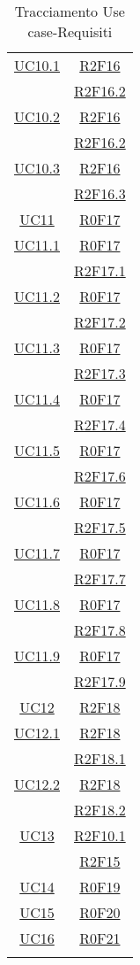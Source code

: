 \begin{longtable}{|c|c|}
\hline
\hyperlink{UC10.1}{UC10.1} & \hyperlink{R2F16}{R2F16}\\
& \hyperlink{R2F16.2}{R2F16.2}\\
\hline
\hyperlink{UC10.2}{UC10.2} & \hyperlink{R2F16}{R2F16}\\
& \hyperlink{R2F16.2}{R2F16.2}\\
\hline
\hyperlink{UC10.3}{UC10.3} & \hyperlink{R2F16}{R2F16}\\
& \hyperlink{R2F16.3}{R2F16.3}\\
\hline
\hyperlink{UC11}{UC11} & \hyperlink{R0F17}{R0F17}\\
\hline
\hyperlink{UC11.1}{UC11.1} & \hyperlink{R0F17}{R0F17}\\
& \hyperlink{R2F17.1}{R2F17.1}\\
\hline
\hyperlink{UC11.2}{UC11.2} & \hyperlink{R0F17}{R0F17}\\
& \hyperlink{R2F17.2}{R2F17.2}\\
\hline
\hyperlink{UC11.3}{UC11.3} & \hyperlink{R0F17}{R0F17}\\
& \hyperlink{R2F17.3}{R2F17.3}\\
\hline
\hyperlink{UC11.4}{UC11.4} & \hyperlink{R0F17}{R0F17}\\
& \hyperlink{R2F17.4}{R2F17.4}\\
\hline
\hyperlink{UC11.5}{UC11.5} & \hyperlink{R0F17}{R0F17}\\
& \hyperlink{R2F17.6}{R2F17.6}\\
\hline
\hyperlink{UC11.6}{UC11.6} & \hyperlink{R0F17}{R0F17}\\
& \hyperlink{R2F17.5}{R2F17.5}\\
\hline
\hyperlink{UC11.7}{UC11.7} & \hyperlink{R0F17}{R0F17}\\
& \hyperlink{R2F17.7}{R2F17.7}\\
\hline
\hyperlink{UC11.8}{UC11.8} & \hyperlink{R0F17}{R0F17}\\
& \hyperlink{R2F17.8}{R2F17.8}\\
\hline
\hyperlink{UC11.9}{UC11.9} & \hyperlink{R0F17}{R0F17}\\
& \hyperlink{R2F17.9}{R2F17.9}\\
\hline
\hyperlink{UC12}{UC12} & \hyperlink{R2F18}{R2F18}\\
\hline
\hyperlink{UC12.1}{UC12.1} & \hyperlink{R2F18}{R2F18}\\
& \hyperlink{R2F18.1}{R2F18.1}\\
\hline
\hyperlink{UC12.2}{UC12.2} & \hyperlink{R2F18}{R2F18}\\
& \hyperlink{R2F18.2}{R2F18.2}\\
\hline
\hyperlink{UC13}{UC13} & \hyperlink{R2F10.1}{R2F10.1}\\
& \hyperlink{R2F15}{R2F15}\\
\hline
\hyperlink{UC14}{UC14} & \hyperlink{R0F19}{R0F19}\\
\hline
\hyperlink{UC15}{UC15} & \hyperlink{R0F20}{R0F20}\\
\hline
\hyperlink{UC16}{UC16} & \hyperlink{R0F21}{R0F21}\\
\hline
\caption[Tracciamento Use case-Requisiti]{Tracciamento Use case-Requisiti}
\label{tabella:requi-usecase}
\end{longtable}
\clearpage
